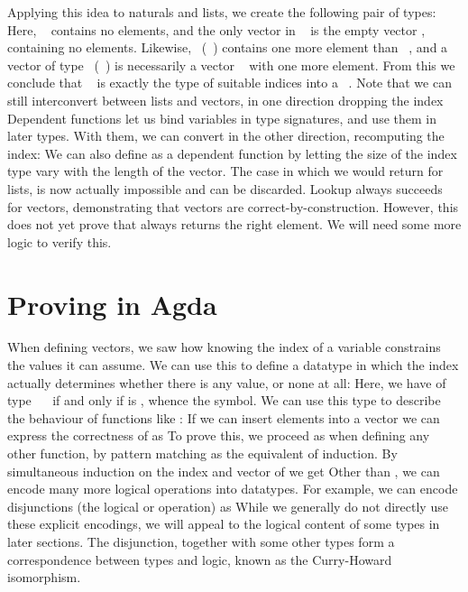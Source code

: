 Applying this idea to naturals and lists, we create the following pair of types:
Here, \  contains no elements, and the only vector in \  is the empty vector \AIC{[]}, containing no elements. Likewise, \ (\ ) contains one more element than \ , and a vector of type \ (\ ) is necessarily a vector \  with one more element. From this we conclude that \  is exactly the type of suitable indices into a \ . Note that we can still interconvert between lists and vectors, in one direction dropping the index
Dependent functions let us bind variables in type signatures, and use them in later types. With them, we can convert in the other direction, recomputing the index:
We can also define
as a dependent function by letting the size of the index type vary with the length of the vector. The case in which we would return  for lists, is now actually impossible and can be discarded. Lookup always succeeds for vectors, demonstrating that vectors are correct-by-construction. However, this does not yet prove that  always returns the right element. We will need some more logic to verify this.

\section{Proving in Agda}\label{sec:background-proving}
When defining vectors, we saw how knowing the index of a variable constrains the values it can assume. We can use this to define a datatype in which the index actually determines whether there is any value, or none at all:
Here, we have  of type \ \  if and only if  is , whence the  symbol. We can use this type to describe the behaviour of functions like : If we can insert elements into a vector
we can express the correctness of  as
To prove this, we proceed as when defining any other function, by pattern matching as the equivalent of induction. %
By simultaneous induction on the index and vector of  we get
Other than , we can encode many more logical operations into datatypes. For example, we can encode disjunctions (the logical or operation) as
While we generally do not directly use these explicit encodings, we will appeal to the logical content of some types in later sections. The disjunction, together with some other types form a correspondence between types and logic, known as the Curry-Howard isomorphism.

